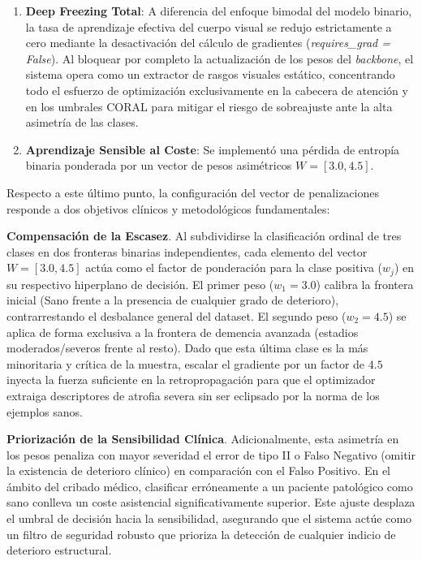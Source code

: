 \documentclass[12pt, oneside, english, spanish]{book}
\begin{document}
\begin{itemize}
	\begin{enumerate}
		\item \textbf{Deep Freezing Total}: A diferencia del enfoque bimodal del modelo binario, la tasa de aprendizaje efectiva del cuerpo visual se redujo estrictamente a cero mediante la desactivación del cálculo de gradientes (\textit{requires\_grad = False}). Al bloquear por completo la actualización de los pesos del \textit{backbone}, el sistema opera como un extractor de rasgos visuales estático, concentrando todo el esfuerzo de optimización exclusivamente en la cabecera de atención y en los umbrales CORAL para mitigar el riesgo de sobreajuste ante la alta asimetría de las clases.
		\item \textbf{Aprendizaje Sensible al Coste}: Se implementó una pérdida de entropía binaria ponderada por un vector de pesos asimétricos $W = [3.0, 4.5]$. 
	\end{enumerate}
\end{itemize}

Respecto a este último punto, la configuración del vector de penalizaciones responde a dos objetivos clínicos y metodológicos fundamentales:

\textbf{Compensación de la Escasez}. Al subdividirse la clasificación ordinal de tres clases en dos fronteras binarias independientes, cada elemento del vector $W = [3.0, 4.5]$ actúa como el factor de ponderación para la clase positiva ($w_j$) en su respectivo hiperplano de decisión. El primer peso ($w_1 = 3.0$) calibra la frontera inicial (Sano frente a la presencia de cualquier grado de deterioro), contrarrestando el desbalance general del dataset. El segundo peso ($w_2 = 4.5$) se aplica de forma exclusiva a la frontera de demencia avanzada (estadios moderados/severos frente al resto). Dado que esta última clase es la más minoritaria y crítica de la muestra, escalar el gradiente por un factor de $4.5$ inyecta la fuerza suficiente en la retropropagación para que el optimizador extraiga descriptores de atrofia severa sin ser eclipsado por la norma de los ejemplos sanos.

\textbf{Priorización de la Sensibilidad Clínica}. Adicionalmente, esta asimetría en los pesos penaliza con mayor severidad el error de tipo II o Falso Negativo (omitir la existencia de deterioro clínico) en comparación con el Falso Positivo. En el ámbito del cribado médico, clasificar erróneamente a un paciente patológico como sano conlleva un coste asistencial significativamente superior. Este ajuste desplaza el umbral de decisión hacia la sensibilidad, asegurando que el sistema actúe como un filtro de seguridad robusto que prioriza la detección de cualquier indicio de deterioro estructural.
\end{document}
